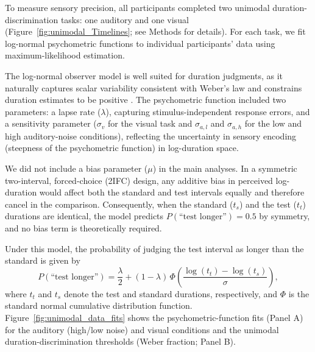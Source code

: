 \documentclass{jov}
\providecommand{\citep}[1]{\cite{#1}}
\begin{document}
To measure sensory precision, all participants completed two unimodal duration-discrimination tasks: one auditory and one visual (Figure~\ref{fig:unimodal_Timelines}; see Methods for details). For each task, we fit log-normal psychometric functions to individual participants' data using maximum-likelihood estimation.

The log-normal observer model is well suited for duration judgments, as it naturally captures scalar variability consistent with Weber's law and constrains duration estimates to be positive \citep{haigh2021role}. The psychometric function included two parameters: a lapse rate ($\lambda$), capturing stimulus-independent response errors, and a sensitivity parameter ($\sigma_v$ for the visual task and $\sigma_{a,l}$ and $\sigma_{a,h}$ for the low and high auditory-noise conditions), reflecting the uncertainty in sensory encoding (steepness of the psychometric function) in log-duration space.

We did not include a bias parameter ($\mu$) in the main analyses. In a symmetric two-interval, forced-choice (2IFC) design, any additive bias in perceived log-duration would affect both the standard and test intervals equally and therefore cancel in the comparison. Consequently, when  the standard ($t_s$) and the test ($t_t$) durations are identical, the model predicts $P(\text{``test longer''}) = 0.5$ by symmetry, and no bias term is theoretically required. 

Under this model, the probability of judging the test interval as longer than the standard is given by
\begin{equation}
P(\text{``test longer''}) = \frac{\lambda}{2} + (1-\lambda)\,
\Phi\!\left(\frac{\log(t_t)-{\log(t_s)}}{\sigma}\right),
\end{equation}
where $t_t$ and $t_s$ denote the test and standard durations, respectively, and $\Phi$ is the standard normal cumulative distribution function. Figure~\ref{fig:unimodal_data_fits} shows the psychometric-function fits (Panel A) for the auditory (high/low noise) and visual conditions and the unimodal duration-discrimination thresholds (Weber fraction; Panel B).
\end{document}
